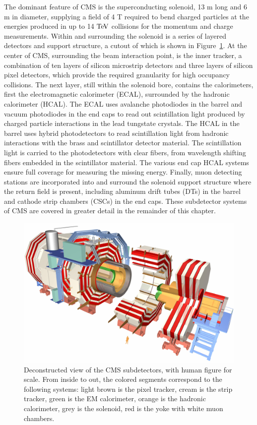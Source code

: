 \indent The dominant feature of CMS is the superconducting solenoid, 13 m long and 6 m in diameter, supplying a field of 4 T required to bend charged particles at the energies produced in up to 14 $\mathrm{Te\kern -0.1em V}$ collisions for the momentum and charge measurements. Within and surrounding the solenoid is a series of layered detectors and support structure, a cutout of which is shown in Figure~\ref{fig:cms}. At the center of CMS, surrounding the beam interaction point, is the inner tracker, a combination of ten layers of silicon microstrip detectors and three layers of silicon pixel detectors, which provide the required granularity for high occupancy collisions. The next layer, still within the solenoid bore, contains the calorimeters, first the electromagnetic calorimeter (ECAL), surrounded by the hadronic calorimeter (HCAL). The ECAL uses avalanche photodiodes in the barrel and vacuum photodiodes in the end caps to read out scintillation light produced by charged particle interactions in the lead tungstate crystals. The HCAL in the barrel uses hybrid photodetectors to read scintillation light from hadronic interactions with the brass and scintillator detector material. The scintillation light is carried to the photodetectors with clear fibers, from wavelength shifting fibers embedded in the scintillator material. The various end cap HCAL systems ensure full coverage for measuring the missing energy. Finally, muon detecting stations are incorporated into and surround the solenoid support structure where the return field is present, including aluminum drift tubes (DTs) in the barrel and cathode strip chambers (CSCs) in the end caps. These subdetector systems of CMS are covered in greater detail in the remainder of this chapter. 

\begin{figure}[tbh]
\centering
\includegraphics[width=6in]{figures/cms.jpg}
\caption{Deconstructed view of the CMS subdetectors, with human figure for scale. From inside to out, the colored segments correspond to the following systems: light brown is the pixel tracker, cream is the strip tracker, green is the EM calorimeter, orange is the hadronic calorimeter, grey is the solenoid, red is the yoke with white muon chambers. }
\label{fig:cms}
\end{figure}

